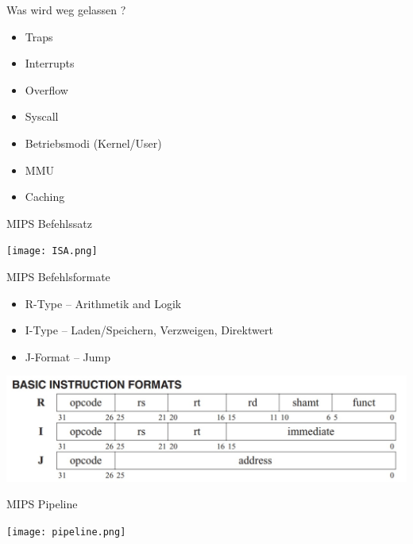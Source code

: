 \begin{frame}{Was wird weg gelassen ?}
\begin{itemize}
       \item Traps
       \item Interrupts 
		\item Overflow
		\item Syscall
        \item Betriebsmodi (Kernel/User)
 		\item MMU
 		\item Caching

\end{itemize}
\end {frame}
\begin{frame}{MIPS Befehlssatz}
\begin{center}
\texttt{[image: ISA.png]}
\end{center}

\end{frame}

\begin{frame}{MIPS Befehlsformate}
\begin{itemize}
		\item R-Type -- Arithmetik and Logik
       \item I-Type -- Laden/Speichern, Verzweigen, Direktwert
       \item J-Format -- Jump
\end{itemize}

\begin{center}
\includegraphics[keepaspectratio=true,width=0.83\paperwidth]{instruction-formats.jpeg}
\end{center}
\end{frame}
\begin{frame}{MIPS Pipeline}
\begin{center}

\texttt{[image: pipeline.png]}
\end{center}


\end{frame}

